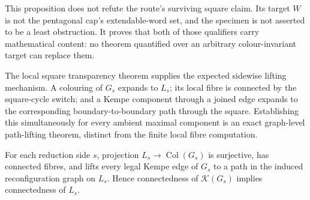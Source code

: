 This proposition does not refute the route's surviving square claim.  Its
target \(W\) is not the pentagonal cap's extendable-word set, and the
specimen is not asserted to be a least obstruction.  It proves that both of
those qualifiers carry mathematical content: no theorem quantified over an
arbitrary colour-invariant target can replace them.

The local square transparency theorem supplies the expected sidewise
lifting mechanism.  A colouring of \(G_s\) expands to \(L_s\); its local
fibre is connected by the square-cycle switch; and a Kempe component through
a joined edge expands to the corresponding boundary-to-boundary path through
the square.  Establishing this simultaneously for every ambient maximal
component is an exact graph-level path-lifting theorem, distinct from the
finite local fibre computation.

\begin{theorem}
\label{prop:square-side-path-lifting}
\Sprose
For each reduction side \(s\), projection
\(L_s\to\operatorname{Col}(G_s)\) is surjective, has connected fibres, and
lifts every legal Kempe edge of \(G_s\) to a path in the induced
reconfiguration graph on \(L_s\).  Hence connectedness of
\(\mathcal K(G_s)\) implies connectedness of \(L_s\).
\end{theorem}

